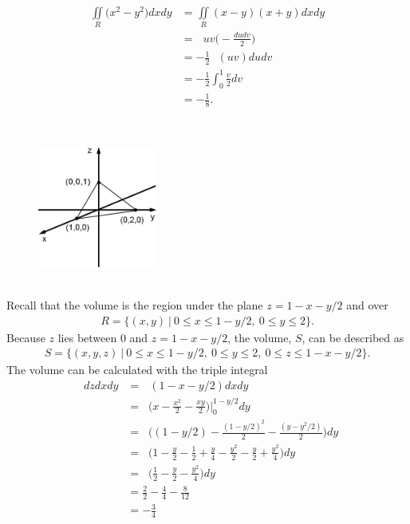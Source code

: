 \documentclass{article}
\begin{document}
\begin{align*}
  \iint\limits_R \big(x^2 - y^2\big) dxdy 
  &=  \iint\limits_R (x - y)(x+y) dxdy \\
  &=    \mathop{\int_0^1 \! \int_0^1} uv \Big(-\frac{dudv}{2} \Big) \\
  &=   -  \frac{1}{2}\mathop{\int_0^1 \! \int_0^1} (uv) dudv \\
  &=   -  \frac{1}{2}\int_0^1 \frac{v}{2} dv \\
  &=  - \frac{1}{8}.
\end{align*}
\item %
 \\
\begin{figure}[h]
  \vspace{-1pt}
  \begin{center}
    \includegraphics[width=0.35\textwidth]{TetExample.jpg}
  \end{center}
\end{figure}\\
Recall that the volume is the region under the plane $z = 1 - x - y/2$ and over  
\begin{align*}
  R = \{ (x,y) \ | \ 0 \le x \le 1- y/2, \ 0 \le y \le 2 \}.
\end{align*}
Because $z$ lies between 0 and $z = 1 - x - y/2$, the volume, $S$, can be described as
\begin{align*}
  S = \{ (x,y,z) \ | \ 0 \le x \le 1- y/2, \ 0 \le y \le 2, \ 0 \le z \le 1 - x - y/2 \}.
\end{align*}
The volume can be calculated with the triple integral
\begin{align*}
  \mathop{\int_{0}^{2} \! \int_0^{1-y/2} \int_0^{1-x-y/2} }dzdxdy
  &= \mathop{\int_{0}^{2} \! \int_0^{1-y/2}  } ( 1-x-y/2) dxdy\\
  &= \mathop{\int_{0}^{2}  } \Big( x-\frac{x^2}{2}-\frac{xy}{2}\Big)\Big|_0^{1-y/2} dy \\
  &= \mathop{\int_{0}^{2}  } \Big( (1-y/2)-\frac{(1-y/2)^2}{2}-\frac{(y-y^2/2)}{2}\Big) dy \\
  &= \mathop{\int_{0}^{2}  } \Big( 1 - \frac{y}{2}-\frac{1}{2} + \frac{y}{4} -\frac{y^2}{2}-\frac{y}{2}+\frac{y^2}{4}\Big) dy \\
  &= \mathop{\int_{0}^{2}  } \Big( \frac{1}{2} - \frac{y}{2}  -\frac{y^2}{4} \Big) dy \\
  &= \frac{2}{2} - \frac{4}{4}  -\frac{8}{12} \\
  &=  -\frac{3}{4}
\end{align*} 
\end{document}
